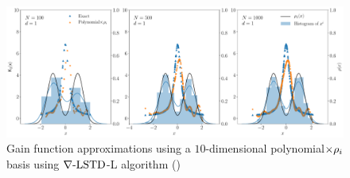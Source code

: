 \begin{figure}
	\includegraphics[width=6in]{images/Chap4_lang_td_wt_polynomials}
	\caption[$\gradTD$-L performance with polynomial basis]{Gain function approximations using a $10$-dimensional polynomial$\times \rho_i$ basis using $\gradTD$-L algorithm ()}
	\label{fig:diff_td_lang_linear}
\end{figure}

